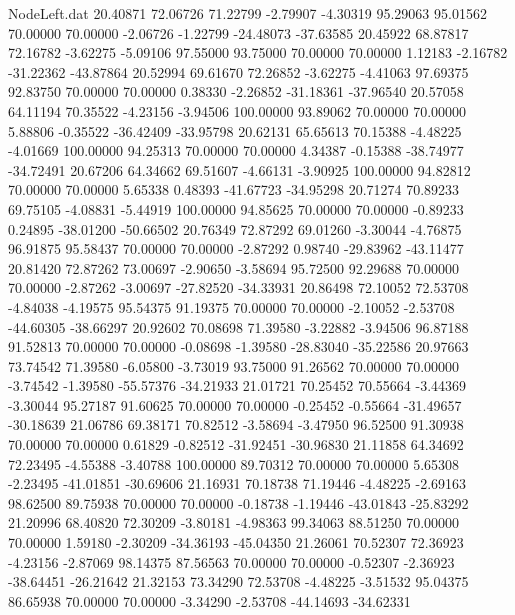 \begin{filecontents}{NodeLeft.dat}
  20.40871   72.06726   71.22799    -2.79907   -4.30319   95.29063   95.01562   70.00000   70.00000   -2.06726   -1.22799  -24.48073  -37.63585
  20.45922   68.87817   72.16782    -3.62275   -5.09106   97.55000   93.75000   70.00000   70.00000    1.12183   -2.16782  -31.22362  -43.87864
  20.52994   69.61670   72.26852    -3.62275   -4.41063   97.69375   92.83750   70.00000   70.00000    0.38330   -2.26852  -31.18361  -37.96540
  20.57058   64.11194   70.35522    -4.23156   -3.94506  100.00000   93.89062   70.00000   70.00000    5.88806   -0.35522  -36.42409  -33.95798
  20.62131   65.65613   70.15388    -4.48225   -4.01669  100.00000   94.25313   70.00000   70.00000    4.34387   -0.15388  -38.74977  -34.72491
  20.67206   64.34662   69.51607    -4.66131   -3.90925  100.00000   94.82812   70.00000   70.00000    5.65338    0.48393  -41.67723  -34.95298
  20.71274   70.89233   69.75105    -4.08831   -5.44919  100.00000   94.85625   70.00000   70.00000   -0.89233    0.24895  -38.01200  -50.66502
  20.76349   72.87292   69.01260    -3.30044   -4.76875   96.91875   95.58437   70.00000   70.00000   -2.87292    0.98740  -29.83962  -43.11477
  20.81420   72.87262   73.00697    -2.90650   -3.58694   95.72500   92.29688   70.00000   70.00000   -2.87262   -3.00697  -27.82520  -34.33931
  20.86498   72.10052   72.53708    -4.84038   -4.19575   95.54375   91.19375   70.00000   70.00000   -2.10052   -2.53708  -44.60305  -38.66297
  20.92602   70.08698   71.39580    -3.22882   -3.94506   96.87188   91.52813   70.00000   70.00000   -0.08698   -1.39580  -28.83040  -35.22586
  20.97663   73.74542   71.39580    -6.05800   -3.73019   93.75000   91.26562   70.00000   70.00000   -3.74542   -1.39580  -55.57376  -34.21933
  21.01721   70.25452   70.55664    -3.44369   -3.30044   95.27187   91.60625   70.00000   70.00000   -0.25452   -0.55664  -31.49657  -30.18639
  21.06786   69.38171   70.82512    -3.58694   -3.47950   96.52500   91.30938   70.00000   70.00000    0.61829   -0.82512  -31.92451  -30.96830
  21.11858   64.34692   72.23495    -4.55388   -3.40788  100.00000   89.70312   70.00000   70.00000    5.65308   -2.23495  -41.01851  -30.69606
  21.16931   70.18738   71.19446    -4.48225   -2.69163   98.62500   89.75938   70.00000   70.00000   -0.18738   -1.19446  -43.01843  -25.83292
  21.20996   68.40820   72.30209    -3.80181   -4.98363   99.34063   88.51250   70.00000   70.00000    1.59180   -2.30209  -34.36193  -45.04350
  21.26061   70.52307   72.36923    -4.23156   -2.87069   98.14375   87.56563   70.00000   70.00000   -0.52307   -2.36923  -38.64451  -26.21642
  21.32153   73.34290   72.53708    -4.48225   -3.51532   95.04375   86.65938   70.00000   70.00000   -3.34290   -2.53708  -44.14693  -34.62331

\end{filecontents}
